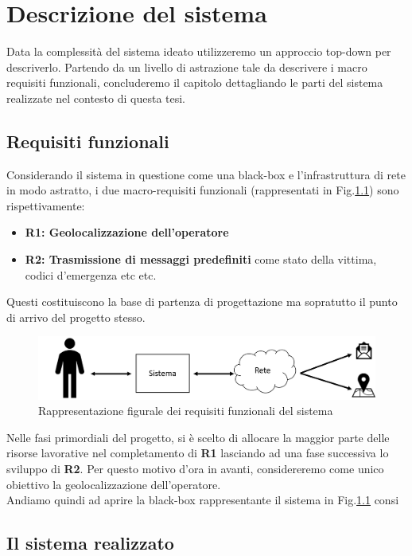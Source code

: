 \chapter{Descrizione del sistema}
\label{scenario}
Data la complessità del sistema ideato utilizzeremo un approccio top-down per descriverlo. Partendo da un livello di astrazione tale da descrivere i macro requisiti funzionali, concluderemo il capitolo dettagliando le parti del sistema realizzate nel contesto di questa tesi.


\section{Requisiti funzionali}
Considerando il sistema in questione come una black-box e l'infrastruttura di rete in modo astratto, i due macro-requisiti funzionali (rappresentati in Fig.\ref{fig:requisitiFunzionali}) sono rispettivamente:
\begin{itemize}
	\item \textbf{R1: Geolocalizzazione dell'operatore}
	\item \textbf{R2: Trasmissione di messaggi predefiniti} come stato della vittima, codici d'emergenza etc etc.
\end{itemize}
 Questi costituiscono la base di partenza di progettazione ma sopratutto il punto di arrivo del progetto stesso. \\
\begin{figure}[H]
	\centering
	\includegraphics[scale=0.3]{DescrizioneDelSistema/requisitiSistema.png}
	\caption{Rappresentazione figurale dei requisiti funzionali del sistema }
	\label{fig:requisitiFunzionali}
\end{figure}
Nelle fasi primordiali del progetto, si è scelto di allocare la maggior parte delle risorse lavorative nel completamento di \textbf{R1} lasciando ad una fase successiva lo sviluppo di \textbf{R2}. Per questo motivo d'ora in avanti, considereremo come unico obiettivo la geolocalizzazione dell'operatore.\\
Andiamo quindi ad aprire la black-box rappresentante il sistema in Fig.\ref{fig:requisitiFunzionali} consi





\section{Il sistema realizzato}